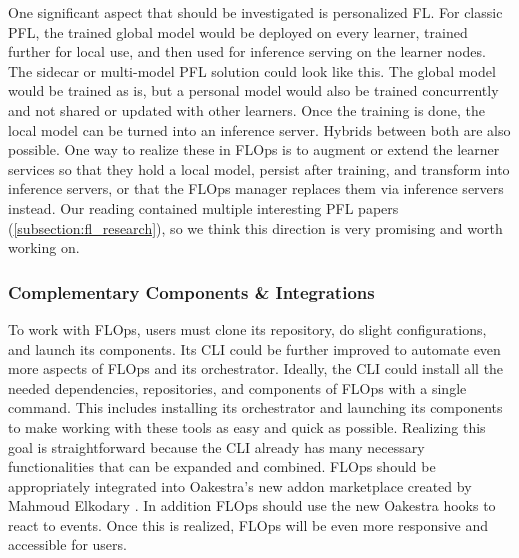 One significant aspect that should be investigated is personalized FL.
For classic PFL, the trained global model would be deployed on every learner, trained further for local use, and then used for inference serving on the learner nodes.
The sidecar or multi-model PFL solution could look like this.
The global model would be trained as is, but a personal model would also be trained concurrently and not shared or updated with other learners.
Once the training is done, the local model can be turned into an inference server.
Hybrids between both are also possible.
One way to realize these in FLOps is to augment or extend the learner services so that they hold a local model, persist after training, and transform into inference servers, or that the FLOps manager replaces them via inference servers instead.
Our reading contained multiple interesting PFL papers (\ref{subsection:fl_research}), so we think this direction is very promising and worth working on.

\subsubsection{Complementary Components \& Integrations}
To work with FLOps, users must clone its repository, do slight configurations, and launch its components.
Its CLI could be further improved to automate even more aspects of FLOps and its orchestrator.
Ideally, the CLI could install all the needed dependencies, repositories, and components of FLOps with a single command.
This includes installing its orchestrator and launching its components to make working with these tools as easy and quick as possible.
Realizing this goal is straightforward because the CLI already has many necessary functionalities that can be expanded and combined.
FLOps should be appropriately integrated into Oakestra's new addon marketplace created by Mahmoud Elkodary \cite{thesis:tum_mahmoud}.
In addition FLOps should use the new Oakestra hooks to react to events.
Once this is realized, FLOps will be even more responsive and accessible for users.

